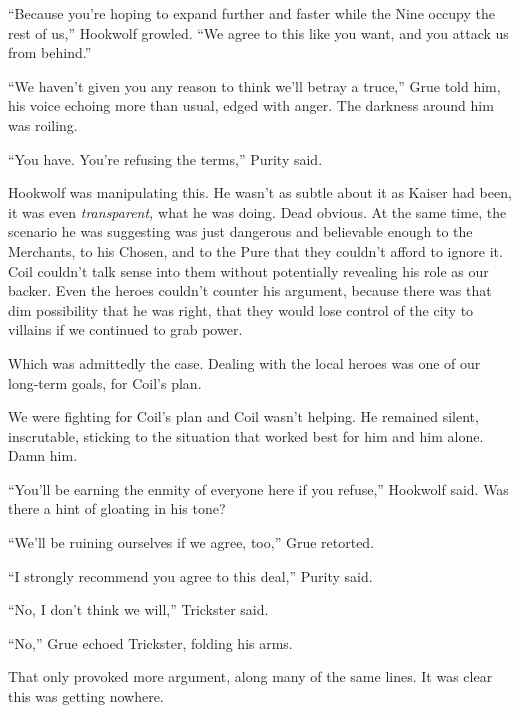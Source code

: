``Because you're hoping to expand further and faster while the Nine occupy the rest of us,'' Hookwolf growled. ``We agree to this like you want, and you attack us from behind.''



``We haven't given you any reason to think we'll betray a truce,'' Grue told him, his voice echoing more than usual, edged with anger.  The darkness around him was roiling.



``You have.  You're refusing the terms,'' Purity said.



Hookwolf was manipulating this.  He wasn't as subtle about it as Kaiser had been, it was even \emph{transparent,} what he was doing.  Dead obvious.  At the same time, the scenario he was suggesting was just dangerous and believable enough to the Merchants, to his Chosen, and to the Pure that they couldn't afford to ignore it.  Coil couldn't talk sense into them without potentially revealing his role as our backer.  Even the heroes couldn't counter his argument, because there was that dim possibility that he was right, that they would lose control of the city to villains if we continued to grab power.



Which was admittedly the case.  Dealing with the local heroes was one of our long-term goals, for Coil's plan.



We were fighting for Coil's plan and Coil wasn't helping.  He remained silent, inscrutable, sticking to the situation that worked best for him and him alone.  Damn him.



``You'll be earning the enmity of everyone here if you refuse,'' Hookwolf said.  Was there a hint of gloating in his tone?



``We'll be ruining ourselves if we agree, too,'' Grue retorted.



``I strongly recommend you agree to this deal,'' Purity said.



``No, I don't think we will,'' Trickster said.



``No,'' Grue echoed Trickster, folding his arms.



That only provoked more argument, along many of the same lines.  It was clear this was getting nowhere.




